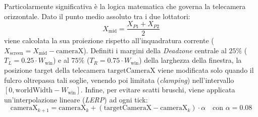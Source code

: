 \documentclass[11pt, a4paper]{article}
\begin{document}
	Particolarmente significativa è la logica matematica che governa la telecamera orizzontale. Dato il punto medio assoluto tra i due lottatori:
	\begin{equation}
		X_{\text{mid}} = \frac{X_{P1} + X_{P2}}{2}
	\end{equation}
	viene calcolata la sua proiezione rispetto all'inquadratura corrente ($X_{\text{screen}} = X_{\text{mid}} - \text{cameraX}$). Definiti i margini della \emph{Deadzone} centrale al $25\%$ ($T_L = 0.25 \cdot W_{\text{win}}$) e al $75\%$ ($T_R = 0.75 \cdot W_{\text{win}}$) della larghezza della finestra, la posizione target della telecamera $\text{targetCameraX}$ viene modificata solo quando il fulcro oltrepassa tali soglie, venendo poi limitata (\emph{clamping}) nell'intervallo $[0, \text{worldWidth} - W_{\text{win}}]$. Infine, per evitare scatti bruschi, viene applicata un'interpolazione lineare (\emph{LERP}) ad ogni tick:
	\begin{equation}
		\text{cameraX}_{k+1} = \text{cameraX}_{k} + \left(\text{targetCameraX} - \text{cameraX}_{k}\right) \cdot \alpha \quad \text{con } \alpha = 0.08
	\end{equation}
	
\end{document}
